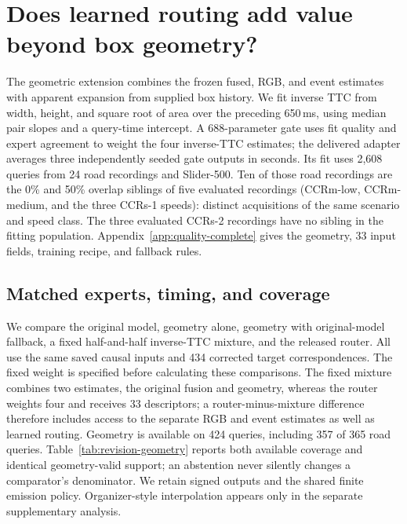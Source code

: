 \section{Does learned routing add value beyond box geometry?}
\label{sec:quality-adaptation}
The geometric extension combines the frozen fused, RGB, and event estimates with apparent expansion from supplied box history. We fit inverse TTC from width, height, and square root of area over the preceding 650\,ms, using median pair slopes \citep{sen1968} and a query-time intercept. A 688-parameter gate uses fit quality and expert agreement to weight the four inverse-TTC estimates; the delivered adapter averages three independently seeded gate outputs in seconds. Its fit uses 2,608 queries from 24 road recordings and Slider-500. Ten of those road recordings are the 0\% and 50\% overlap siblings of five evaluated recordings (CCRm-low, CCRm-medium, and the three CCRs-1 speeds): distinct acquisitions of the same scenario and speed class. The three evaluated CCRs-2 recordings have no sibling in the fitting population. Appendix~\ref{app:quality-complete} gives the geometry, 33 input fields, training recipe, and fallback rules.

\subsection{Matched experts, timing, and coverage}
We compare the original model, geometry alone, geometry with original-model fallback, a fixed half-and-half inverse-TTC mixture, and the released router. All use the same saved causal inputs and 434 corrected target correspondences. The fixed weight is specified before calculating these comparisons. The fixed mixture combines two estimates, the original fusion and geometry, whereas the router weights four and receives 33 descriptors; a router-minus-mixture difference therefore includes access to the separate RGB and event estimates as well as learned routing. Geometry is available on 424 queries, including 357 of 365 road queries. Table~\ref{tab:revision-geometry} reports both available coverage and identical geometry-valid support; an abstention never silently changes a comparator's denominator. We retain signed outputs and the shared finite emission policy. Organizer-style interpolation appears only in the separate supplementary analysis.



